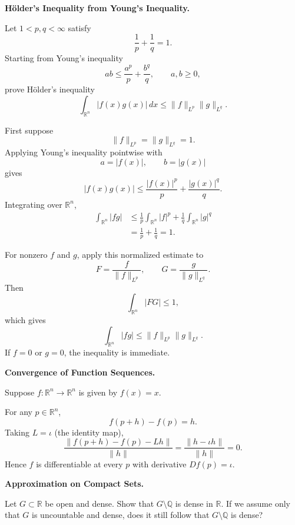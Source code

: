 \begin{problem}[CP-II-0142]
\label{prob:cp-ii-0142}
\textbf{Hölder's Inequality from Young's Inequality.}

\hspace*{1.5em}Let \(1<p,q<\infty\) satisfy
\[
\frac1p+\frac1q=1.
\]
Starting from Young's inequality
\[
ab\le\frac{a^p}{p}+\frac{b^q}{q},
\qquad a,b\ge0,
\]
prove Hölder's inequality
\[
\int_{\mathbb R^n}|f(x)g(x)|\,dx
\le
\|f\|_{L^p}\|g\|_{L^q}.
\]
\end{problem}

\begin{solution}
First suppose
\[
\|f\|_{L^p}=\|g\|_{L^q}=1.
\]
Applying Young's inequality pointwise with
\[
a=|f(x)|,
\qquad
b=|g(x)|
\]
gives
\[
|f(x)g(x)|
\le
\frac{|f(x)|^p}{p}
+
\frac{|g(x)|^q}{q}.
\]
Integrating over \(\mathbb R^n\),
\[
\begin{aligned}
\int_{\mathbb R^n}|fg|
&\le
\frac1p\int_{\mathbb R^n}|f|^p
+
\frac1q\int_{\mathbb R^n}|g|^q\\
&=
\frac1p+\frac1q
=
1.
\end{aligned}
\]

For nonzero \(f\) and \(g\), apply this normalized estimate to
\[
F=\frac{f}{\|f\|_{L^p}},
\qquad
G=\frac{g}{\|g\|_{L^q}}.
\]
Then
\[
\int_{\mathbb R^n}|FG|\le1,
\]
which gives
\[
\boxed{
\int_{\mathbb R^n}|fg|
\le
\|f\|_{L^p}\|g\|_{L^q}.
}
\]
If \(f=0\) or \(g=0\), the inequality is immediate.
\end{solution}


\begin{problem}[CP-II-0144]
\label{prob:cp-ii-0144}
\textbf{Convergence of Function Sequences.}

\hspace*{1.5em}Suppose $f:\mathbb{R}^n\to\mathbb{R}^n$ is given by $f(x)=x$.
\end{problem}

\begin{solution}
For any $p\in\mathbb{R}^n$,
	\[
	f(p+h)-f(p)=h.
	\]
	Taking $L=\iota$ (the identity map),
	\[
	\frac{\|f(p+h)-f(p)-Lh\|}{\|h\|} = \frac{\|h-\iota h\|}{\|h\|}=0.
	\]
	Hence $f$ is differentiable at every $p$ with derivative $Df(p)=\iota$.
\end{solution}

\begin{problem}[CP-II-0147]
\label{prob:cp-ii-0147}
\textbf{Approximation on Compact Sets.}

	Let $G\subset\mathbb R$ be open and dense. Show that $G\setminus\mathbb Q$ is dense in $\mathbb R$.
	If we assume only that $G$ is uncountable and dense, does it still follow that $G\setminus\mathbb Q$ is dense?
\end{problem}

